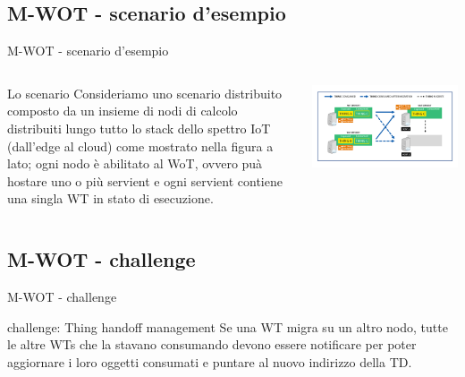 \documentclass{beamer}
\begin{document}
\subsection{M-WOT - scenario d'esempio}
\begin{frame}{M-WOT - scenario d'esempio}
	\begin{columns}
		\begin{column}[c]{0.5\textwidth}
			\begin{block}{Lo scenario}
				Consideriamo uno scenario distribuito composto da un insieme di nodi di calcolo distribuiti lungo
				tutto lo stack dello spettro IoT (dall’edge al cloud) come mostrato nella figura a lato; ogni nodo è abilitato
				al WoT, ovvero puà hostare uno o più servient  e ogni
				servient contiene una singla WT in stato di esecuzione.
			\end{block}
		\end{column}
		\begin{column}[c]{0.5\textwidth}
			\centering
			\includegraphics[width=\textwidth]{./images/4.png}
		\end{column}
	\end{columns}
\end{frame}



\subsection{M-WOT - challenge}

\begin{frame}{M-WOT - challenge}
	\begin{alertblock}{challenge: Thing handoff management}
		Se una WT migra su un altro nodo, tutte le altre WTs che la stavano consumando devono essere notificare per poter aggiornare i loro oggetti consumati e puntare al nuovo indirizzo della TD. \\
	\end{alertblock}
\end{frame}
\end{document}
